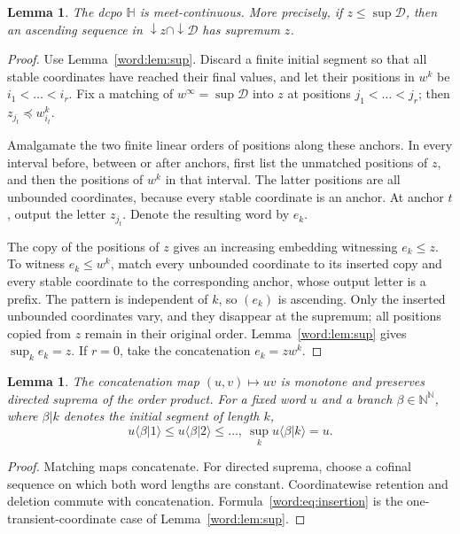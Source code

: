 \documentclass[10pt,a4paper]{article}
\newtheorem{lemma}[theorem]{Lemma}
\theoremstyle{definition}
\newcommand{\N}{\mathbb N}
\newcommand{\HH}{\mathbb H}
\begin{document}
\begin{lemma}\label{word:lem:mc}
The dcpo $\HH$ is meet-continuous. More precisely, if $z\leq\sup\mathcal D$, then an ascending sequence in ${\downarrow} z\cap{\downarrow}\mathcal D$ has supremum $z$.
\end{lemma}
\begin{proof}
Use Lemma~\ref{word:lem:sup}. Discard a finite initial segment so that all stable coordinates have reached their final values, and let their positions in $w^k$ be $i_1<\ldots<i_r$. Fix a matching of $w^\infty=\sup\mathcal D$ into $z$ at positions $j_1<\ldots<j_r$; then $z_{j_t}\preceq w^k_{i_t}$.

Amalgamate the two finite linear orders of positions along these anchors. In every interval before, between or after anchors, first list the unmatched positions of $z$, and then the positions of $w^k$ in that interval. The latter positions are all unbounded coordinates, because every stable coordinate is an anchor. At anchor $t$, output the letter $z_{j_t}$. Denote the resulting word by $e_k$.

The copy of the positions of $z$ gives an increasing embedding witnessing $e_k\leq z$. To witness $e_k\leq w^k$, match every unbounded coordinate to its inserted copy and every stable coordinate to the corresponding anchor, whose output letter is a prefix. The pattern is independent of $k$, so $(e_k)$ is ascending. Only the inserted unbounded coordinates vary, and they disappear at the supremum; all positions copied from $z$ remain in their original order. Lemma~\ref{word:lem:sup} gives $\sup_k e_k=z$. If $r=0$, take the concatenation $e_k=zw^k$.
\end{proof}

\begin{lemma}\label{word:lem:concat}
The concatenation map $(u,v)\mapsto uv$ is monotone and preserves directed suprema of the order product. For a fixed word $u$ and a branch $\beta\in\N^\N$, where $\beta|k$ denotes the initial segment of length $k$,
\begin{equation}\label{word:eq:insertion}
 u\langle\beta|1\rangle\leq u\langle\beta|2\rangle\leq\ldots,
 ~
 \sup_k u\langle\beta|k\rangle=u.
\end{equation}
\end{lemma}
\begin{proof}
Matching maps concatenate. For directed suprema, choose a cofinal sequence on which both word lengths are constant. Coordinatewise retention and deletion commute with concatenation. Formula~\eqref{word:eq:insertion} is the one-transient-coordinate case of Lemma~\ref{word:lem:sup}.
\end{proof}
\end{document}
